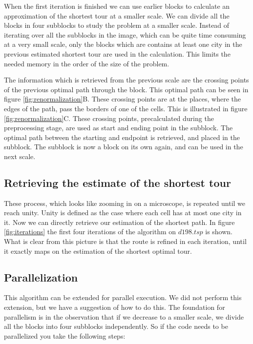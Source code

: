 When the first iteration is finished we can use earlier blocks to calculate an
approximation of the shortest tour at a smaller scale. We can divide all the
blocks in four subblocks to study the problem at a smaller scale. Instead of
iterating over all the subblocks in the image, which can be quite time
consuming at a very small scale, only the blocks which are contains at least
one city in the previous estimated shortest tour are used in the calculation.
This limits the needed memory in the order of the size of the problem.

The information which is retrieved from the previous scale are the crossing
points of the previous optimal path through the block. This optimal path can be
seen in figure \ref{fig:renormalization}B.  These crossing points are at the
places, where the edges of the path, pass the borders of one of the cells. This
is illustrated in figure \ref{fig:renormalization}C. These crossing points,
precalculated during the preprocessing stage, are used as start and ending
point in the subblock. The optimal path between the starting and endpoint is
retrieved, and placed in the subblock. The subblock is now a block on its own
again, and can be used in the next scale.

\subsection{Retrieving the estimate of the shortest tour}
These process, which looks like zooming in on a microscope, is repeated until
we reach unity. Unity is defined as the case where each cell has at most one
city in it. Now we can directly retrieve our estimation of the shortest path.
In figure \ref{fig:iterations} the first four iterations of the algorithm on
$d198.tsp$ is shown. What is clear from this picture is that the route is
refined in each iteration, until it exactly maps on the estimation  of the
shortest optimal tour.

\subsection{Parallelization}
This algorithm can be extended for parallel execution. We did not perform this
extension, but we have a suggestion of how to do this. The foundation for
parallelism is in the observation that if we decrease to a smaller scale, we
divide all the blocks into four subblocks independently. So if the code needs
to be parallelized you take the following steps:

